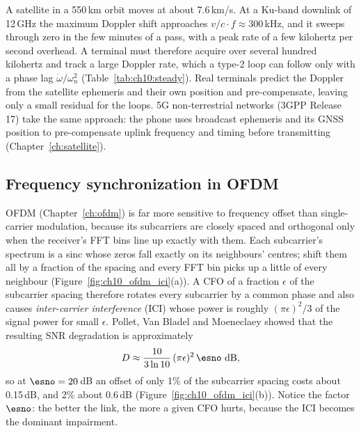 \begin{inpractice}
A satellite in a 550\,km orbit moves at about 7.6\,km/s. At a Ku-band downlink of 12\,GHz the maximum
Doppler shift approaches $v/c\cdot f\approx300$\,kHz, and it sweeps through zero in the few minutes of a pass, with
a peak rate of a few kilohertz per second overhead. A terminal must therefore acquire over several
hundred kilohertz and track a large Doppler rate, which a type-2 loop can follow only with a phase lag
$\dot\omega/\omega_n^2$ (Table~\ref{tab:ch10:steady}). Real terminals predict the Doppler from the
satellite ephemeris and their own position and pre-compensate, leaving only a small residual for the
loops. 5G non-terrestrial networks (3GPP Release 17) take the same approach: the phone uses
broadcast ephemeris and its GNSS position to pre-compensate uplink frequency and timing before
transmitting (Chapter~\ref{ch:satellite}).
\end{inpractice}

\subsection{Frequency synchronization in OFDM}

OFDM (Chapter~\ref{ch:ofdm}) is far more sensitive to frequency offset than single-carrier
modulation, because its subcarriers are closely spaced and orthogonal only when the receiver's
FFT bins line up exactly with them. Each subcarrier's spectrum is a sinc whose zeros fall exactly
on its neighbours' centres; shift them all by a fraction of the spacing and every FFT bin picks up
a little of every neighbour (Figure~\ref{fig:ch10_ofdm_ici}(a)). A CFO of a fraction $\epsilon$ of
the subcarrier spacing therefore rotates every subcarrier by a common phase and also causes
\emph{inter-carrier interference} (ICI) whose power is roughly $(\pi\epsilon)^2/3$ of the signal power
for small $\epsilon$. Pollet, Van Bladel and Moeneclaey showed that the resulting SNR degradation is
approximately
\begin{equation}
D\approx\frac{10}{3\ln10}\,(\pi\epsilon)^2\,\esno\ \text{dB},
\end{equation}
so at $\esno=20$\,dB an offset of only 1\% of the subcarrier spacing costs about 0.15\,dB, and 2\%
about 0.6\,dB (Figure~\ref{fig:ch10_ofdm_ici}(b)). Notice the factor $\esno$: the better the link,
the more a given CFO hurts, because the ICI becomes the dominant impairment.


